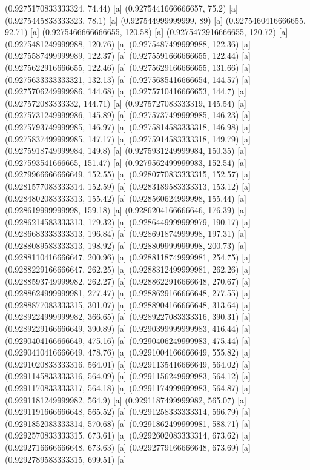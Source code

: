 {{{(0.9275170833333324, 74.44) [a] 
(0.9275441666666657, 75.2) [a] 
(0.9275445833333323, 78.1) [a] 
(0.927544999999999, 89) [a] 
(0.9275460416666655, 92.71) [a] 
(0.9275466666666655, 120.58) [a] 
(0.9275472916666655, 120.72) [a] 
(0.9275481249999988, 120.76) [a] 
(0.9275487499999988, 122.36) [a] 
(0.9275587499999989, 122.37) [a] 
(0.9275591666666655, 122.44) [a] 
(0.9275622916666655, 122.46) [a] 
(0.9275629166666655, 131.66) [a] 
(0.9275633333333321, 132.13) [a] 
(0.9275685416666654, 144.57) [a] 
(0.9275706249999986, 144.68) [a] 
(0.9275710416666653, 144.7) [a] 
(0.927572083333332, 144.71) [a] 
(0.9275727083333319, 145.54) [a] 
(0.9275731249999986, 145.89) [a] 
(0.9275737499999985, 146.23) [a] 
(0.9275793749999985, 146.97) [a] 
(0.9275814583333318, 146.98) [a] 
(0.9275837499999985, 147.17) [a] 
(0.9275914583333318, 149.79) [a] 
(0.9275918749999984, 149.8) [a] 
(0.9275931249999984, 150.35) [a] 
(0.927593541666665, 151.47) [a] 
(0.9279562499999983, 152.54) [a] 
(0.9279966666666649, 152.55) [a] 
(0.9280770833333315, 152.57) [a] 
(0.9281577083333314, 152.59) [a] 
(0.9283189583333313, 153.12) [a] 
(0.9284802083333313, 155.42) [a] 
(0.928560624999998, 155.44) [a] 
(0.928619999999998, 159.18) [a] 
(0.9286204166666646, 176.39) [a] 
(0.9286214583333313, 179.32) [a] 
(0.9286449999999979, 190.17) [a] 
(0.9286683333333313, 196.84) [a] 
(0.928691874999998, 197.31) [a] 
(0.9288089583333313, 198.92) [a] 
(0.928809999999998, 200.73) [a] 
(0.9288110416666647, 200.96) [a] 
(0.9288118749999981, 254.75) [a] 
(0.9288229166666647, 262.25) [a] 
(0.9288312499999981, 262.26) [a] 
(0.9288593749999982, 262.27) [a] 
(0.9288622916666648, 270.67) [a] 
(0.9288624999999981, 277.47) [a] 
(0.9288629166666648, 277.55) [a] 
(0.9288877083333315, 301.07) [a] 
(0.9288904166666648, 313.64) [a] 
(0.9289224999999982, 366.65) [a] 
(0.9289227083333316, 390.31) [a] 
(0.9289229166666649, 390.89) [a] 
(0.9290399999999983, 416.44) [a] 
(0.9290404166666649, 475.16) [a] 
(0.9290406249999983, 475.44) [a] 
(0.9290410416666649, 478.76) [a] 
(0.9291004166666649, 555.82) [a] 
(0.9291020833333316, 564.01) [a] 
(0.9291135416666649, 564.02) [a] 
(0.9291145833333316, 564.09) [a] 
(0.9291156249999983, 564.12) [a] 
(0.9291170833333317, 564.18) [a] 
(0.9291174999999983, 564.87) [a] 
(0.9291181249999982, 564.9) [a] 
(0.9291187499999982, 565.07) [a] 
(0.9291191666666648, 565.52) [a] 
(0.9291258333333314, 566.79) [a] 
(0.9291852083333314, 570.68) [a] 
(0.9291862499999981, 588.71) [a] 
(0.9292570833333315, 673.61) [a] 
(0.9292602083333314, 673.62) [a] 
(0.9292716666666648, 673.63) [a] 
(0.9292779166666648, 673.69) [a] 
(0.9292789583333315, 699.51) [a] 
}}}
